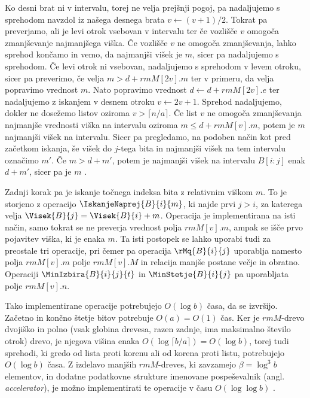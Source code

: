 Ko desni brat ni v intervalu, torej ne velja prejšnji pogoj, pa nadaljujemo s sprehodom navzdol iz našega desnega brata $v\leftarrow (v+1)/2$. Tokrat pa preverjamo, ali je levi otrok vsebovan v intervalu ter če vozlišče $v$ omogoča zmanjševanje najmanjšega viška. Če vozlišče $v$ ne omogoča zmanjševanja, lahko sprehod končamo in vemo, da najmanjši višek je $m$, sicer pa nadaljujemo s sprehodom. Če levi otrok ni vsebovan, nadaljujemo s sprehodom v levem otroku, sicer pa preverimo, če velja $m>d+rmM[2v].m$ ter v primeru, da velja popravimo vrednost $m$. Nato popravimo vrednost $d\leftarrow d+rmM[2v].e$ ter nadaljujemo z iskanjem v desnem otroku $v\leftarrow 2v+1$. Sprehod nadaljujemo, dokler ne dosežemo listov oziroma $v>\lceil n/a\rceil$. Če list $v$ ne omogoča zmanjševanja najmanjše vrednosti viška na intervalu oziroma $m\le d+rmM[v].m$, potem je $m$ najmanjši višek na intervalu. Sicer pa pregledamo, na podoben način kot pred začetkom iskanja, še višek do $j$-tega bita in najmanjši višek na tem intervalu označimo $m'$. Če $m>d+m'$, potem je najmanjši višek na intervalu $B[i:j]$ enak $d+m'$, sicer pa je $m$ \cite{Navarro2016}.

Zadnji korak pa je iskanje točnega indeksa bita z relativnim viškom $m$. To je storjeno z operacijo $\IskanjeNaprej{B}{i}{m}$, ki najde prvi $j> i$, za katerega velja $\Visek{B}{j}=\Visek{B}{i}+m$. Operacija je implementirana na isti način, samo tokrat se ne preverja vrednost polja $rmM[v].m$, ampak se išče prvo pojavitev viška, ki je enaka $m$. Ta isti postopek se lahko uporabi tudi za preostale tri operacije, pri čemer pa operacija $\rMq{B}{i}{j}$ uporablja namesto polja $rmM[v].m$ polje $rmM[v].M$ in relacija manjše postane večje in obratno. Operaciji $\MinIzbira{B}{i}{j}{t}$ in $\MinStetje{B}{i}{j}$ pa uporabljata polje $rmM[v].n$\cite{Navarro2016}.

Tako implementirane operacije potrebujejo $O(\log{b})$ časa, da se izvršijo. Začetno in končno štetje bitov potrebuje $O(a)=O(1)$ čas. Ker je $rmM$-drevo dvojiško in polno (vsak globina drevesa, razen zadnje, ima maksimalno število otrok) drevo, je njegova višina enaka $O(\log{\lceil b/a\rceil})=O(\log{b})$, torej tudi sprehodi, ki gredo od lista proti korenu ali od korena proti listu, potrebujejo $O(\log{b})$ časa. Z izdelavo manjših $rmM$-dreves, ki zavzamejo $\beta=\log^3{b}$ elementov, in dodatne podatkovne strukture imenovane pospeševalnik (angl. \textit{accelerator}), je možno implementirati te operacije v času $O(\log\log{b})$ \cite{Navarro2016}.